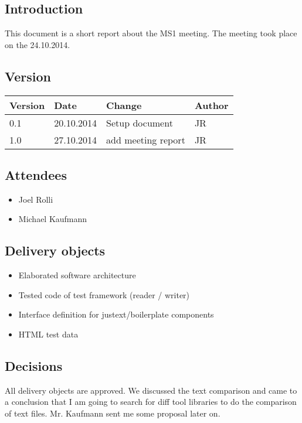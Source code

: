 \subsection{Introduction}

This document is a short report about the MS1 meeting. The meeting took place on the 24.10.2014.

\subsection{Version}


\begin{tabular}{| p{1.5cm} | p{2cm} | p{9cm} | p{1.5cm} |}
    \hline
    Version 	& Date      		& Change & Author 								\\ \hline
    0.1    		& 20.10.2014        & Setup document        				& JR 	\\ \hline
    1.0 		& 27.10.2014 		& add meeting report 					& JR 	\\ \hline
\end{tabular}


\subsection{Attendees}
\begin{itemize}
\item Joel Rolli
\item Michael Kaufmann
\end{itemize}

\subsection{Delivery objects}

\begin{itemize}
\item Elaborated software architecture
\item Tested code of test framework (reader / writer)
\item Interface definition for justext/boilerplate components
\item HTML test data
\end{itemize}


\subsection{Decisions}

All delivery objects are approved. We discussed the text comparison and came to a conclusion that I am going to search for diff tool libraries to do the comparison of text files. Mr. Kaufmann sent me some proposal later on.


